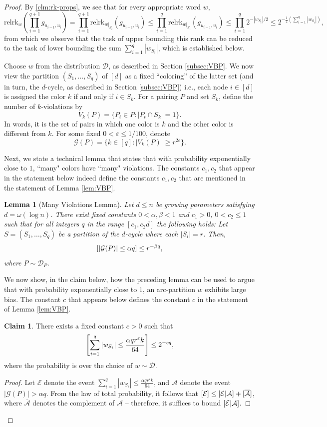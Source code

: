 \documentclass[10pt,a4paper]{article}
\newtheorem{lem}[theorem]{Lemma}
\theoremstyle{definition}%
\newtheorem{claim}[theorem]{Claim}
\theoremstyle{plain}
\let\Pr\relax
\DeclareMathOperator*{\Pr}{\mathbb{P}}
\newcommand{\rk}{\mathrm{relrk}}
\newcommand{\eps}{\varepsilon}
\newcommand{\calA}{\mathcal{A}}
\newcommand{\calD}{\mathcal{D}}
\newcommand{\calE}{\mathcal{E}}
\newcommand{\calG}{\mathcal{G}}
\begin{document}
\begin{proof}
By \autoref{clm:rk-props}, we see that for every appropriate word $w$,
\[
\rk_w\left(\prod_{i = 1}^{q+1} g_{u_{i-1},u_i}\right) = \prod_{i = 1}^{q+1} \rk_{w|_{S_i}}(g_{u_{i-1},u_i})
\leq \prod_{i = 1}^{q} \rk_{w|_{S_i}}(g_{u_{i-1},u_i})\leq\prod_{i = 1}^q  2^{-|w_{S_i}|/2}\leq 2^{-\frac12\left(\sum_{i=1}^q |w_{S_i}|\right)},
\]
from which we observe that the task of upper bounding this rank can be reduced to the task of lower bounding the sum $\sum_{i=1}^{q}|w_{S_i}|$, which is established below. 

Choose $w$ from the distribution $\calD$, as described in Section \ref{subsec:VBP}. We now view the partition $(S_1,\ldots,S_q)$ of $[d]$ as a fixed ``coloring'' of the latter set (and in turn, the $d$-cycle, as described in Section \ref{subsec:VBP}) i.e., each node $i\in[d]$ is assigned the color $k$ if and only if $i\in S_k$. For a pairing $P$ and set $S_k$, define the number of $k$-violations by
$$
V_k(P) = \{P_t \in P : |P_t \cap S_k| = 1\}.
$$
In words, it is the set of pairs in which one color is $k$ and the other color is different from $k$. For some fixed $0<\eps\leq 1/100$, denote
$$
\calG(P) = \{k \in [q] : |V_k(P)| \geq r^{2\eps}\}.
$$

Next, we state a technical lemma that states that with probability exponentially close to $1$, ``many" colors have ``many" violations. The constants $c_1,c_2$ that appear in the statement below indeed define the constants $c_1,c_2$ that are mentioned in the statement of Lemma \ref{lem:VBP}.
\begin{lem}[Many Violations Lemma]\label{lem:many-viol} Let $d\leq n$ be growing parameters satisfying $d = \omega(\log n)$. There exist fixed constants 
$0<\alpha,\beta<1$ and $c_1>0$, $0<c_2\leq 1$ such that for all integers $q$ in the range $ [c_1,c_2d] $ the following holds:
Let $S = (S_1, \ldots, S_q)$ be a partition of the $d$-cycle where each $|S_i| = r$.
Then,
$$
\Pr[|\calG(P)| \leq \alpha q] \leq r^{-\beta q},
$$
where $P\sim \calD_P$.
\end{lem}

We now show, in the claim below, how the preceding lemma can be used to argue that with probability exponentially close to $1$, an arc-partition $w$ exhibits large bias. The constant $c$ that appears below defines the constant $c$ in the statement of Lemma \ref{lem:VBP}.

\begin{claim}\label{clm:high-bias-VBP}
There exists a fixed constant $c>0$ such that
\[   \Pr\left[\sum_{i=1}^q |w_{S_i}| \leq \frac{\alpha qr^\eps k}{64}\right] \leq 2^{-cq},
\]
where the probability is over the choice of $w\sim \calD$.
\end{claim}
\begin{proof}
Let $\calE$ denote the event $\sum_{i=1}^q |w_{S_i}| \leq \frac{\alpha qr^\eps k}{64}$, and $\calA$ denote the event $|\calG(P)| > \alpha q$. From the law of total probability, it follows that $\Pr[\calE]\leq \Pr[\calE|\calA] + \Pr[\overline{\calA}]$, where $\overline{\calA}$ denotes the complement of $\calA$ -- therefore, it suffices to bound $\Pr[\calE|\calA]$. 


\end{proof}
\end{proof}
\end{document}
